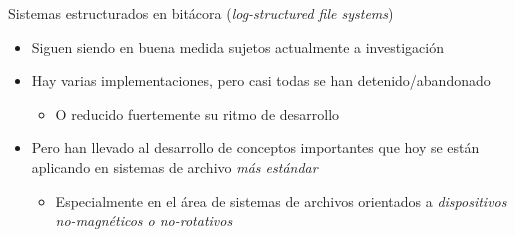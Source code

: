 \documentclass[presentation]{beamer}
\begin{document}
\begin{frame}[label={sec:org2917278}]{Sistemas estructurados en bitácora (\emph{log-structured file systems})}
\begin{itemize}
\item Siguen siendo en buena medida sujetos actualmente a investigación
\item Hay varias implementaciones, pero casi todas se han
detenido/abandonado
\begin{itemize}
\item O reducido fuertemente su ritmo de desarrollo
\end{itemize}
\item Pero han llevado al desarrollo de conceptos importantes que hoy se
están aplicando en sistemas de archivo \emph{más estándar}
\begin{itemize}
\item Especialmente en el área de sistemas de archivos orientados a
\emph{dispositivos no-magnéticos o no-rotativos}
\end{itemize}
\end{itemize}
\end{frame}
\end{document}
